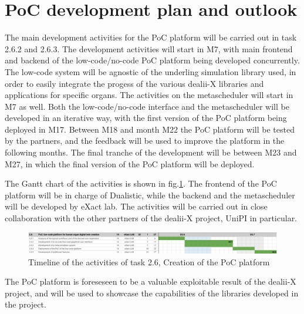 \documentclass[a4paper,12pt]{article}
\begin{document}
\section{\textcolor{EUblue}{PoC development plan and outlook}}

The main development activities for the PoC platform will be carried out in task 2.6.2 and 2.6.3. The development activities will start in M7, with main frontend and backend of the low-code/no-code PoC platform being developed concurrently. The low-code system will be agnostic of the underling simulation library used, in order to easily integrate the progess of the various dealii-X libraries and applications for specific organs. The activities on the metascheduler will start in M7 as well. Both the low-code/no-code interface and the metascheduler will be developed in an iterative way, with the first version of the PoC platform being deployed in M17. Between M18 and month M22 the PoC platform will be tested by the partners, and the feedback will be used to improve the platform in the following months. The final tranche of the development will be between M23 and M27, in which the final version of the PoC platform will be deployed.

The Gantt chart of the activities is shown in fig.\ref{gannt}. The frontend of the PoC platform will be in charge of Dualistic, while the backend and the metascheduler will be developed by eXact lab. The activities will be carried out in close collaboration with the other partners of the dealii-X project, UniPI in particular. 
\begin{figure}
    \includegraphics[width=400pt]{gantt.png}
    \caption{Timeline of the activities of task 2.6, Creation of the PoC platform}
    \label{gannt}
\end{figure}
The PoC platform is foreseseen to be a valuable exploitable result of the dealii-X project, and will be used to showcase the capabilities of the libraries developed in the project.

\label{MyLastPage}
\end{document}

